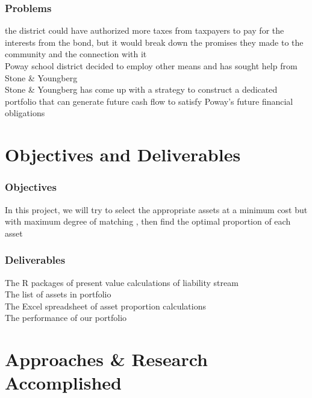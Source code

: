 \documentclass[compress,handout,10pt]{beamer}
\begin{document}
\begin{frame}
    \frametitle{Problems}
the district could have authorized more taxes from taxpayers to pay for the interests from the bond, but it would break down the promises they made to the community and the connection with it \\
\vspace{3mm}
Poway school district decided to employ other means and has sought help from Stone \& Youngberg \\
\vspace{3mm}
Stone \& Youngberg has come up with a strategy to construct a dedicated portfolio that can generate future cash flow to satisfy Poway's future financial obligations\\


\end{frame}

\section{Objectives and Deliverables}

\begin{frame}
    \frametitle{Objectives}
In this project, we will try to select the appropriate assets at a minimum cost but with maximum degree of matching , then find the optimal proportion of each asset 
\end{frame}

\begin{frame}
    \frametitle{Deliverables}
The R packages of present value calculations of liability stream\\
\vspace{3mm}
The list of assets in portfolio\\
\vspace{3mm}
The Excel spreadsheet of asset proportion calculations\\
\vspace{3mm}
The performance of our portfolio
\end{frame}

\section{Approaches \& Research Accomplished}
\end{document}
